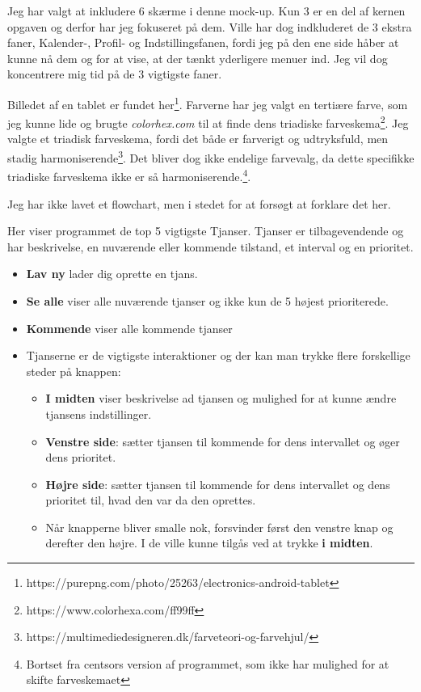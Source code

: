 \documentclass{report}
\begin{document}
Jeg har valgt at inkludere 6 skærme i denne mock-up. Kun 3 er en del af kernen opgaven og derfor har jeg fokuseret på dem. Ville har dog indkluderet de 3 ekstra faner, Kalender-, Profil- og Indstillingsfanen, fordi jeg på den ene side håber at kunne nå dem og for at vise, at der tænkt yderligere menuer ind. Jeg vil dog koncentrere mig tid på de 3 vigtigste faner.\par{}
Billedet af en tablet er fundet her\footnote{https://purepng.com/photo/25263/electronics-android-tablet}. Farverne har jeg valgt en tertiære farve, som jeg kunne lide og brugte \textit{colorhex.com} til at finde dens triadiske farveskema\footnote{https://www.colorhexa.com/ff99ff}. Jeg valgte et triadisk farveskema, fordi det både er farverigt og udtryksfuld, men stadig harmoniserende\footnote{https://multimediedesigneren.dk/farveteori-og-farvehjul/}. Det bliver dog ikke endelige farvevalg, da dette specifikke triadiske farveskema ikke er så harmoniserende.\footnote{Bortset fra centsors version af programmet, som ikke har mulighed for at skifte farveskemaet}.\par{}
Jeg har ikke lavet et flowchart, men i stedet for at forsøgt at forklare det her.\par{}

Her viser programmet de top 5 vigtigste Tjanser. Tjanser er tilbagevendende og har beskrivelse, en nuværende eller kommende tilstand, et interval og en prioritet.
\begin{itemize}
\item \textbf{Lav ny} lader dig oprette en tjans.
\item \textbf{Se alle} viser alle nuværende tjanser og ikke kun de 5 højest prioriterede.
\item \textbf{Kommende} viser alle kommende tjanser
\item Tjanserne er de vigtigste interaktioner og der kan man trykke flere forskellige steder på knappen:
\begin{itemize}
\item \textbf{I midten} viser beskrivelse ad tjansen og mulighed for at kunne ændre tjansens indstillinger.
\item \textbf{Venstre side}: sætter tjansen til kommende for dens intervallet og øger dens prioritet.
\item \textbf{Højre side}: sætter tjansen til kommende for dens intervallet og dens prioritet til, hvad den var da den oprettes.
\item Når knapperne bliver smalle nok, forsvinder først den venstre knap og derefter den højre. I de ville kunne tilgås ved at trykke \textbf{i midten}.
\end{itemize}
\end{itemize}
\end{document}
